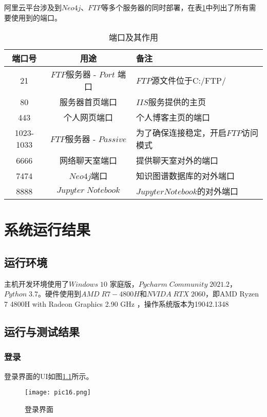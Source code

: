\documentclass[forprint]{OSPaper}
\begin{document}
阿里云平台涉及到$Neo4j$、$FTP$等多个服务器的同时部署，在表\ref{table:4}中列出了所有需要使用到的端口。

\begin{table}[ht]
	\caption{端口及其作用}
	\label{table:4}
	\begin{tabular}{ccl}
		\hline
		端口号 & 用途     & 备注                         \\ \hline
		21  & $FTP$服务器 - $Port$ 端口   & $FTP$源文件位于C:/FTP/   \\
		80   & 服务器首页端口   & $IIS$服务提供的主页  \\
		443   & 个人网页端口   & 个人博客主页的端口  \\
		1023-1033   & $FTP$服务器 - $Passive$& 为了确保连接稳定，开启$FTP$访问模式  \\
		6666   & 网络聊天室端口   & 提供聊天室对外的端口  \\
		7474   & $Neo4j$端口 & 知识图谱数据库的对外端口        \\
		8888   & $Jupyter \; Notebook$   & $Jupyter Notebook$的对外端口 \\ \hline
	\end{tabular}
\end{table}

\chapter{系统运行结果}

\section{运行环境}

主机开发环境使用了$ Windows \; 10 $ 家庭版，$ Pycharm \; Community \; 2021.2 $，$ Python \; 3.7 $。硬件使用到$ AMD \; R7-4800H $和$ NVIDA \; RTX \; 2060 $，即AMD Ryzen 7 4800H with Radeon Graphics 2.90 GHz
，操作系统版本为19042.1348

\section{运行与测试结果}

\subsection{登录}

登录界面的UI如图\ref{fig:16}所示。

\begin{figure}[!htbp]
	\centering
	\texttt{[image: pic16.png]}
	\caption{登录界面}
	\label{fig:16}
\end{figure}
\end{document}
